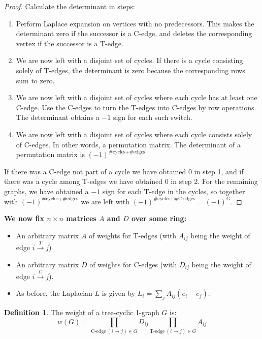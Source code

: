 \documentclass[a4paper, 11pt]{article}
\theoremstyle{definition}
\newtheorem{definition}{Definition}[section]
\begin{document}
\begin{proof}
  Calculate the determinant in steps:
  \begin{enumerate}
    \item Perform Laplace expansion on vertices with no predecessors. This makes the determinant zero if the successor is a C-edge, and deletes the corresponding vertex if the successor is a T-edge.
    \item We are now left with a disjoint set of cycles. If there is a cycle consisting solely of T-edges, the determinant is zero because the corresponding rows sum to zero.
    \item We are now left with a disjoint set of cycles where each cycle has at least one C-edge. Use the C-edges to turn the T-edges into C-edges by row operations. The determinant obtains a $-1$ sign for each such switch.
    \item We are now left with a disjoint set of cycles where each cycle consists solely of C-edges. In other words, a permutation matrix. The determinant of a permutation matrix is $(-1)^{\text{\#cycles} + \text{\#edges}}$
  \end{enumerate}
  If there was a C-edge not part of a cycle we have obtained $0$ in step 1, and if there was a cycle among T-edges we have obtained $0$ in step 2. For the remaining graphs, we have obtained a $-1$ sign for each T-edge in the cycles, so together with $(-1)^{\text{\#cycles} + \text{\#edges}}$ we are left with $(-1)^{\text{\#cycles} + \text{\#C-edges}} = (-1)^G$.
\end{proof}

\textbf{We now fix $n\times n$ matrices $A$ and $D$ over some ring:}

\begin{itemize}
  \item An arbitrary matrix $A$ of weights for T-edges (with $A_{ij}$ being the weight of edge $i \xrightarrow{T} j$)
  \item An arbitrary matrix $D$ of weights for C-edges (with $D_{ij}$ being the weight of edge $i \xrightarrow{C} j$).
  \item As before, the Laplacian $L$ is given by $L_i = \sum_j A_{ij}(e_i - e_j)$.
\end{itemize}


\begin{definition}
  The weight of a tree-cyclic 1-graph $G$ is:
  \[
    w(G) = \prod_{\text{C-edge}\ (i \to j) \in G} D_{ij} \prod_{\text{T-edge}\ (i \to j) \in G} A_{ij}
  \]
\end{definition}
\end{document}
